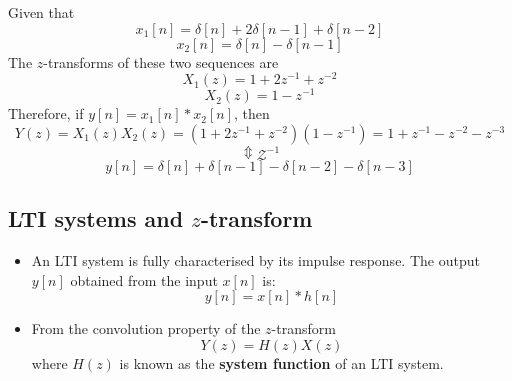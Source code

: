 \begin{ex}{}
Given that 
\[
x_1[n] = \delta[n] + 2\delta[n-1] + \delta[n-2]
\]
\[
x_2[n] = \delta[n] -\delta[n-1]
\]
The $z$-transforms of these two sequences are
\[
X_1(z) = 1 + 2z^{-1} +z^{-2}
\]
\[
X_2(z) = 1 - z^{-1}
\]
Therefore, if $y[n] = x_{1}[n] * x_{2}[n]$, then
\[
Y(z) = X_{1}(z)X_{2}(z) = (1 + 2z^{-1} +z^{-2})(1 - z^{-1}) = 1 + z^{-1} - z^{-2} - z^{-3}
\]
\[\Updownarrow\mathcal{Z}^{-1}\]
\[
y[n] = \delta[n] + \delta[n-1] - \delta[n-2] - \delta[n-3]
\]
\end{ex}


\subsection{LTI systems and $z$-transform}
\begin{itemize}
    \item An LTI system is fully characterised by its impulse response. The output $y[n]$ obtained from the input $x[n]$ is:
    \[
    y[n] = x[n] * h[n]
    \]

    \item From the convolution property of the $z$-transform
    \[
    Y(z) = H(z)X(z) 
    \]
    where $H(z)$ is known as the \textbf{system function} of an LTI system.
\end{itemize}

